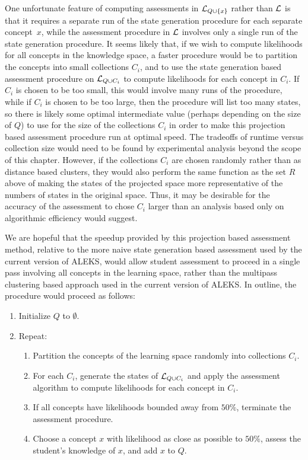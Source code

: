 \documentclass[11pt]{llncs}
\begin{document}
{One unfortunate feature of computing assessments in ${\cal L}_{Q\cup\{x\}}$ rather than $\cal L$ is that it requires a separate run of the state generation procedure for each separate concept~$x$, while the assessment procedure in ${\cal L}$ involves only a single run of the state generation procedure. It seems likely that, if we wish to compute likelihoods for all concepts in the knowledge space,
a faster procedure would be to partition the concepts into small collections $C_i$, and to use the state generation based assessment procedure on ${\cal L}_{Q\cup C_i}$ to compute likelihoods for each concept in $C_i$. If $C_i$ is chosen to be too small, this would involve many runs of the procedure, while if $C_i$ is chosen to be too large, then the procedure will list too many states, so there is likely some optimal intermediate value (perhaps depending on the size of $Q$) to use for the size of the collections $C_i$ in order to make this projection based assessment procedure run at optimal speed. The tradeoffs of runtime versus collection size would need to be found by experimental analysis beyond the scope of this chapter. However, if the collections $C_i$ are chosen randomly rather than as distance based clusters, they would also perform the same function as the set $R$ above of making
the states of the projected space more representative of the numbers of states in the original space. Thus, it may be desirable for the accuracy of the assessment to chose $C_i$ larger than an analysis based only on algorithmic efficiency would suggest.

We are hopeful that the speedup provided by this projection based assessment method, relative to the more naive state generation based assessment used by the current version of ALEKS, would allow student assessment to proceed in a single pass involving all concepts in the learning space, rather than the multipass clustering based approach used in the current version of ALEKS. In outline, the procedure would proceed as follows:

\begin{enumerate}
\item Initialize $Q$ to $\emptyset$.
\item Repeat:
\begin{enumerate}
\item Partition the concepts of the learning space randomly into collections $C_i$.
\item For each $C_i$, generate the states of ${\cal L}_{Q\cup C_i}$ and apply the assessment algorithm to compute likelihoods for each concept in $C_i$.
\item If all concepts have likelihoods bounded away from $50\%$, terminate the assessment procedure.
\item Choose a concept $x$ with likelihood as close as possible to $50\%$, assess the student's knowledge of $x$, and add $x$ to $Q$.
\end{enumerate}
\end{enumerate}

}
\end{document}
